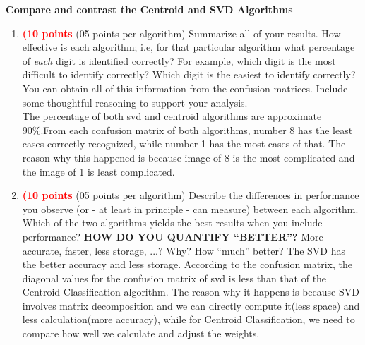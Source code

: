 \documentclass[dvipsnames,12pt]{article} %
\newcommand{\Brd}[1]{{\textbf{\textcolor{Red}{#1}}}}               %
\newcommand{\Brp}[1]{\textbf{\textcolor{RoyalPurple}{#1}}}         %
\newcommand{\Brm}[1]{\textbf{\textcolor[rgb]{0.69,0.19,0.38}{#1}}} %
\begin{document}
        \Brm{Compare and contrast the Centroid and SVD Algorithms}


        \begin{enumerate}[label=\textbf{(\alph*}), leftmargin=48pt]


  		  \vskip 06pt

            \item \Brd{(10 points} (05 points per algorithm) Summarize all of your results.
              How effective is each algorithm; i.e, for that particular algorithm what percentage
              of \emph{each} digit is identified correctly?
              For example, which digit is the most difficult to identify correctly?
              Which digit is the easiest to identify correctly?
              You can obtain all of this information from the confusion matrices.
              Include some thoughtful reasoning to support your analysis.\\
            The percentage of both svd and centroid algorithms are approximate 90\%.From each confusion matrix of both algorithms, number 8 has the least cases correctly recognized, while number 1 has the most cases of that. The reason why this happened is because image of 8 is the most complicated and the image of 1 is least complicated. 
    \vspace{06pt}

        \item \Brd{(10 points} (05 points per algorithm) Describe the differences in performance
          you observe (or - at least in principle - can measure) between each algorithm.
          Which of the two algorithms yields the best results when you include performance?
          \Brp{HOW DO YOU QUANTIFY ``BETTER''?}  More accurate, faster, less storage, ...?
          Why?
          How ``much'' better?
          The SVD has the better accuracy and less storage. According to the confusion matrix, the diagonal values for the confusion matrix of svd is less than that of the Centroid Classification algorithm. The reason why it happens is because SVD involves matrix decomposition and we can directly compute it(less space) and less calculation(more accuracy), while for Centroid Classification, we need to compare how well we calculate and adjust the weights. 

    \end{enumerate}
\end{document}
